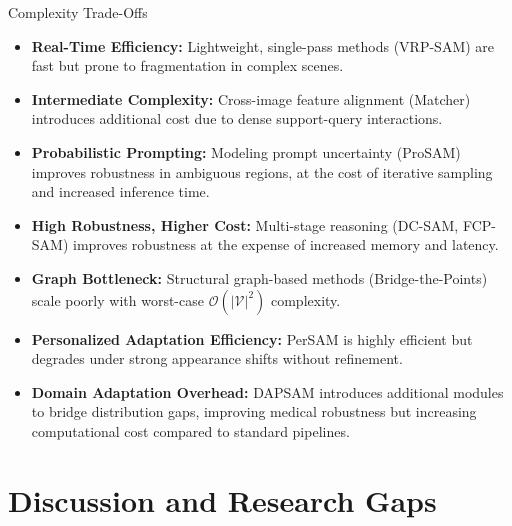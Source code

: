 \documentclass[aspectratio=169, 10pt]{beamer}
\begin{document}
\begin{frame}{Complexity Trade-Offs}
    \footnotesize
    \begin{itemize}
        \item \textbf{Real-Time Efficiency:} Lightweight, single-pass methods (VRP-SAM) are fast but prone to fragmentation in complex scenes.
        \item \textbf{Intermediate Complexity:} Cross-image feature alignment (Matcher) introduces additional cost due to dense support-query interactions.
        \item \textbf{Probabilistic Prompting:} Modeling prompt uncertainty (ProSAM) improves robustness in ambiguous regions, at the cost of iterative sampling and increased inference time.
        \item \textbf{High Robustness, Higher Cost:} Multi-stage reasoning (DC-SAM, FCP-SAM) improves robustness at the expense of increased memory and latency.
        \item \textbf{Graph Bottleneck:} Structural graph-based methods (Bridge-the-Points) scale poorly with worst-case $\mathcal{O}(|\mathcal{V}|^2)$ complexity.
        \item \textbf{Personalized Adaptation Efficiency:} PerSAM is highly efficient but degrades under strong appearance shifts without refinement.
        \item \textbf{Domain Adaptation Overhead:} DAPSAM introduces additional modules to bridge distribution gaps, improving medical robustness but increasing computational cost compared to standard pipelines.
    \end{itemize}
\end{frame}


\section{Discussion and Research Gaps}
\end{document}

